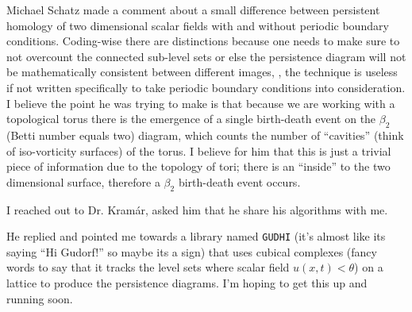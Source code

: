 \begin{description}
{\begin{description}
Michael Schatz made a comment about a small difference between persistent homology
of two dimensional scalar fields with and without periodic boundary conditions. Coding-wise there
are distinctions because one needs to make sure to not overcount the connected sub-level sets or else
the persistence diagram will not be mathematically consistent between different images, \ie, the technique
is useless if not written specifically to take periodic boundary conditions into consideration. I believe the point
he was trying to make is that because we are working with a topological torus
there is the emergence of a single birth-death event on the $\beta_2$ (Betti number equals two) diagram,
which counts the number of ``cavities'' (think of iso-vorticity surfaces) of the torus.
I believe for him that this is just a trivial piece of information
due to the topology of tori; there is an ``inside'' to the two dimensional
surface, therefore a $\beta_2$ birth-death event occurs.

I reached out to Dr. Kram\'ar, asked him that he share his algorithms with me.

He replied and pointed me towards a library named \texttt{GUDHI} (it's almost like its saying ``Hi Gudorf!'' so maybe its a sign) that uses cubical complexes (fancy words to say that it tracks the level sets
where scalar field $u(x,t) < \theta$) on a lattice to produce the persistence diagrams. I'm hoping to get this
up and running soon.
\end{description}
}


\end{description}
